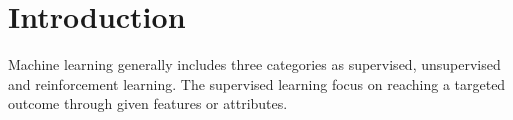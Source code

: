 \section{Introduction}

Machine learning generally includes three categories as supervised, unsupervised and reinforcement learning. The supervised learning focus on reaching a targeted outcome through given features or attributes. 
